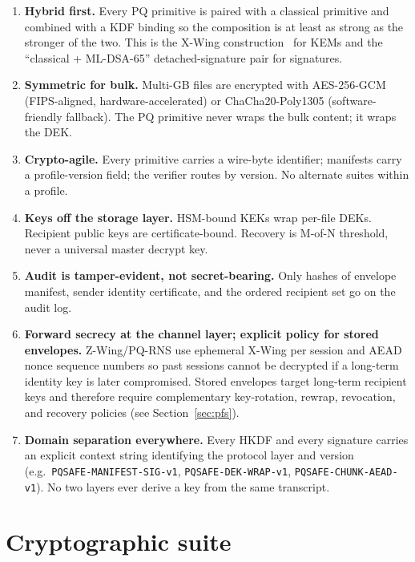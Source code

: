 \documentclass[11pt,a4paper]{article}
\begin{document}
\begin{enumerate}[leftmargin=*,itemsep=0pt]
\item \textbf{Hybrid first.} Every PQ primitive is paired with a
  classical primitive and combined with a KDF binding so the
  composition is at least as strong as the stronger of the two. This
  is the X-Wing construction~\cite{xwing2024} for KEMs and the
  ``classical + ML-DSA-65'' detached-signature pair for signatures.
\item \textbf{Symmetric for bulk.} Multi-GB files are encrypted with
  AES-256-GCM (FIPS-aligned, hardware-accelerated) or
  ChaCha20-Poly1305 (software-friendly fallback). The PQ primitive
  never wraps the bulk content; it wraps the DEK.
\item \textbf{Crypto-agile.} Every primitive carries a wire-byte
  identifier; manifests carry a profile-version field; the verifier
  routes by version. No alternate suites within a profile.
\item \textbf{Keys off the storage layer.} HSM-bound KEKs wrap
  per-file DEKs. Recipient public keys are certificate-bound.
  Recovery is M-of-N threshold, never a universal master decrypt key.
\item \textbf{Audit is tamper-evident, not secret-bearing.} Only
  hashes of envelope manifest, sender identity certificate, and the
  ordered recipient set go on the audit log.
\item \textbf{Forward secrecy at the channel layer; explicit policy
  for stored envelopes.} Z-Wing/PQ-RNS use ephemeral X-Wing per
  session and AEAD nonce sequence numbers so past sessions cannot be
  decrypted if a long-term identity key is later compromised.
  Stored envelopes target long-term recipient keys and therefore
  require complementary key-rotation, rewrap, revocation, and
  recovery policies (see Section~\ref{sec:pfs}).
\item \textbf{Domain separation everywhere.} Every HKDF and every
  signature carries an explicit context string identifying the
  protocol layer and version (e.g.\ \texttt{PQSAFE-MANIFEST-SIG-v1},
  \texttt{PQSAFE-DEK-WRAP-v1}, \texttt{PQSAFE-CHUNK-AEAD-v1}). No two
  layers ever derive a key from the same transcript.
\end{enumerate}

\section{Cryptographic suite}
\label{sec:suite}
\end{document}

